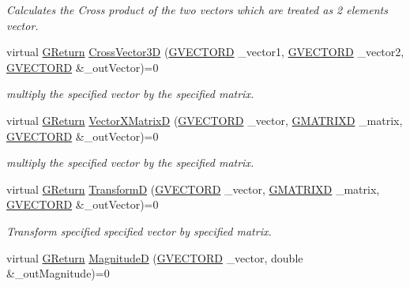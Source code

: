 \begin{DoxyCompactItemize}
\begin{DoxyCompactList}\small\item\em Calculates the Cross product of the two vectors which are treated as 2 elements vector. \end{DoxyCompactList}\item 
virtual \hyperlink{namespaceGW_a67a839e3df7ea8a5c5686613a7a3de21}{G\+Return} \hyperlink{classGW_1_1MATH_1_1GVector_a3556471c23dbd6d8a7e44960153f1dae}{Cross\+Vector3D} (\hyperlink{structGW_1_1MATH_1_1GVECTORD}{G\+V\+E\+C\+T\+O\+RD} \+\_\+vector1, \hyperlink{structGW_1_1MATH_1_1GVECTORD}{G\+V\+E\+C\+T\+O\+RD} \+\_\+vector2, \hyperlink{structGW_1_1MATH_1_1GVECTORD}{G\+V\+E\+C\+T\+O\+RD} \&\+\_\+out\+Vector)=0
\begin{DoxyCompactList}\small\item\em multiply the specified vector by the specified matrix. \end{DoxyCompactList}\item 
virtual \hyperlink{namespaceGW_a67a839e3df7ea8a5c5686613a7a3de21}{G\+Return} \hyperlink{classGW_1_1MATH_1_1GVector_a07512cdb954882137d3e39d3b23e20de}{Vector\+X\+MatrixD} (\hyperlink{structGW_1_1MATH_1_1GVECTORD}{G\+V\+E\+C\+T\+O\+RD} \+\_\+vector, \hyperlink{structGW_1_1MATH_1_1GMATRIXD}{G\+M\+A\+T\+R\+I\+XD} \+\_\+matrix, \hyperlink{structGW_1_1MATH_1_1GVECTORD}{G\+V\+E\+C\+T\+O\+RD} \&\+\_\+out\+Vector)=0
\begin{DoxyCompactList}\small\item\em multiply the specified vector by the specified matrix. \end{DoxyCompactList}\item 
virtual \hyperlink{namespaceGW_a67a839e3df7ea8a5c5686613a7a3de21}{G\+Return} \hyperlink{classGW_1_1MATH_1_1GVector_a7930e1cb3b872c73af46d4ce30264b99}{TransformD} (\hyperlink{structGW_1_1MATH_1_1GVECTORD}{G\+V\+E\+C\+T\+O\+RD} \+\_\+vector, \hyperlink{structGW_1_1MATH_1_1GMATRIXD}{G\+M\+A\+T\+R\+I\+XD} \+\_\+matrix, \hyperlink{structGW_1_1MATH_1_1GVECTORD}{G\+V\+E\+C\+T\+O\+RD} \&\+\_\+out\+Vector)=0
\begin{DoxyCompactList}\small\item\em Transform specified specified vector by specified matrix. \end{DoxyCompactList}\item 
virtual \hyperlink{namespaceGW_a67a839e3df7ea8a5c5686613a7a3de21}{G\+Return} \hyperlink{classGW_1_1MATH_1_1GVector_aa818487d161f4d66a27b3e1948623bdc}{MagnitudeD} (\hyperlink{structGW_1_1MATH_1_1GVECTORD}{G\+V\+E\+C\+T\+O\+RD} \+\_\+vector, double \&\+\_\+out\+Magnitude)=0

\end{DoxyCompactItemize}
